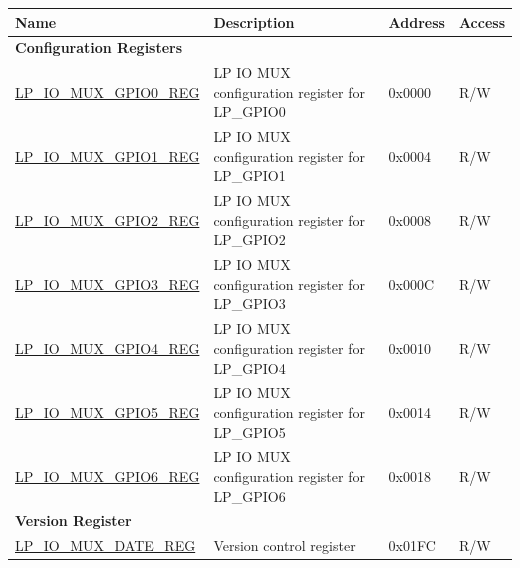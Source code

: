 \begin{longtable}{ | p{6cm} | p{7.2cm} | p{1.3cm} | p{1cm} | }
\hline\rowcolor{lightgray}
\textbf{Name} & \textbf{Description} &  \textbf{Address} & \textbf{Access} \\ \hline
\endhead
\multicolumn{4}{|l|}{\textbf{Configuration Registers}} \\ \hline
\hyperref[regdesc:LPIOMUXGPIONREG]{LP\_IO\_MUX\_GPIO0\_REG} & LP IO MUX configuration register for LP\_GPIO0 & 0x0000 & R/W \\ \hline
\hyperref[regdesc:LPIOMUXGPIONREG]{LP\_IO\_MUX\_GPIO1\_REG} & LP IO MUX configuration register for LP\_GPIO1 & 0x0004 & R/W \\ \hline
\hyperref[regdesc:LPIOMUXGPIONREG]{LP\_IO\_MUX\_GPIO2\_REG} & LP IO MUX configuration register for LP\_GPIO2 & 0x0008 & R/W \\ \hline
\hyperref[regdesc:LPIOMUXGPIONREG]{LP\_IO\_MUX\_GPIO3\_REG} & LP IO MUX configuration register for LP\_GPIO3 & 0x000C & R/W \\ \hline
\hyperref[regdesc:LPIOMUXGPIONREG]{LP\_IO\_MUX\_GPIO4\_REG} & LP IO MUX configuration register for LP\_GPIO4 & 0x0010 & R/W \\ \hline
\hyperref[regdesc:LPIOMUXGPIONREG]{LP\_IO\_MUX\_GPIO5\_REG} & LP IO MUX configuration register for LP\_GPIO5 & 0x0014 & R/W \\ \hline
\hyperref[regdesc:LPIOMUXGPIONREG]{LP\_IO\_MUX\_GPIO6\_REG} & LP IO MUX configuration register for LP\_GPIO6 & 0x0018 & R/W \\ \hline
\multicolumn{4}{|l|}{\textbf{Version Register}} \\ \hline
\hyperref[regdesc:LPIOMUXDATEREG]{LP\_IO\_MUX\_DATE\_REG} & Version control register & 0x01FC & R/W \\ \hline
\end{longtable}
